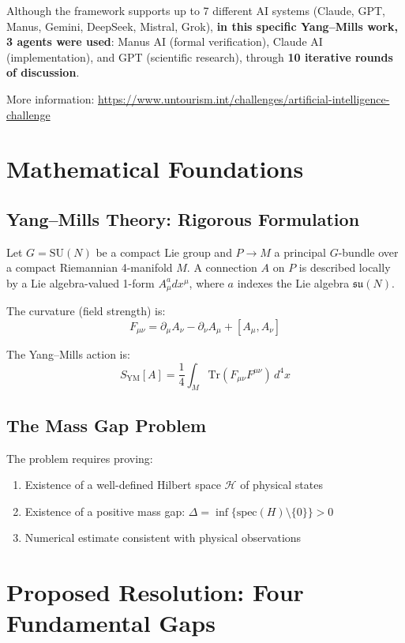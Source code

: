 \documentclass[11pt]{article}
\theoremstyle{definition}
\theoremstyle{remark}
\begin{document}
Although the framework supports up to 7 different AI systems (Claude, GPT, Manus, Gemini, DeepSeek, Mistral, Grok), \textbf{in this specific Yang--Mills work, 3 agents were used}: Manus AI (formal verification), Claude AI (implementation), and GPT (scientific research), through \textbf{10 iterative rounds of discussion}.

More information: \url{https://www.untourism.int/challenges/artificial-intelligence-challenge}

\section{Mathematical Foundations}

\subsection{Yang--Mills Theory: Rigorous Formulation}

Let $G = \text{SU}(N)$ be a compact Lie group and $P \to M$ a principal $G$-bundle over a compact Riemannian 4-manifold $M$. A connection $A$ on $P$ is described locally by a Lie algebra-valued 1-form $A_\mu^a dx^\mu$, where $a$ indexes the Lie algebra $\mathfrak{su}(N)$.

The curvature (field strength) is:
\[
F_{\mu\nu} = \partial_\mu A_\nu - \partial_\nu A_\mu + [A_\mu, A_\nu]
\]

The Yang--Mills action is:
\[
S_{\text{YM}}[A] = \frac{1}{4} \int_M \text{Tr}(F_{\mu\nu} F^{\mu\nu}) \, d^4x
\]

\subsection{The Mass Gap Problem}

The problem requires proving:
\begin{enumerate}
\item Existence of a well-defined Hilbert space $\mathcal{H}$ of physical states
\item Existence of a positive mass gap: $\Delta = \inf\{\text{spec}(H) \setminus \{0\}\} > 0$
\item Numerical estimate consistent with physical observations
\end{enumerate}

\section{Proposed Resolution: Four Fundamental Gaps}
\end{document}
